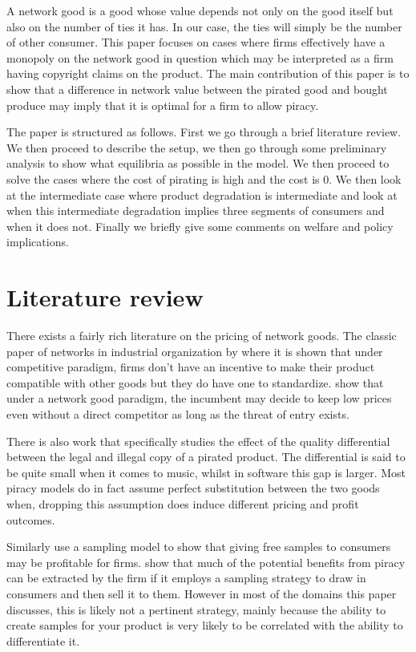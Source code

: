 \documentclass{article}
\begin{document}
A network good is a good whose value depends not only on the good itself but also on the number of ties it has. In our case, the ties will simply be the number of other consumer. This paper focuses on cases where firms effectively have a monopoly on the network good in question which may be interpreted as a firm having copyright claims on the product. The main contribution of this paper is to show that a difference in network value between the pirated good and bought produce may imply that it is optimal for a firm to allow piracy. 

The paper is structured as follows. First we go through a brief literature review. We then proceed to describe the setup, we then go through some preliminary analysis to show what equilibria as possible in the model. We then proceed to solve the cases where the cost of pirating is high and the cost is 0. We then look at the intermediate case where product degradation is intermediate and look at when this intermediate degradation implies three segments of consumers and when it does not. Finally we briefly give some comments on welfare and policy implications. 

\section{Literature review}

There exists a fairly rich literature on the pricing of network goods. The classic paper of networks in industrial organization by \citep{KS86} where it is shown that under  competitive paradigm, firms don't have an incentive to make their product compatible with other goods but they do have one to standardize. \cite{FT00} show that under a network good paradigm, the incumbent may decide to keep low prices even without a direct competitor as long as the threat of entry exists. 

There is also work that specifically studies the effect of the quality differential between the legal and illegal copy of a pirated product. \cite{GL03} The differential is said to be quite small when it comes to music, whilst in software this gap is larger. Most piracy models do in fact assume perfect substitution between the two goods when, dropping this assumption does induce different pricing and profit outcomes. 

Similarly \cite{PW06b} use a sampling model to show that giving free samples to consumers may be profitable for firms. \cite{C05} show that much of the potential benefits from piracy can be extracted by the firm if it employs a sampling strategy to draw in consumers and then sell it to them. However in most of the domains this paper discusses, this is likely not a pertinent strategy, mainly because the ability to create samples for your product is very likely to be correlated with the ability to differentiate it.  
\end{document}
